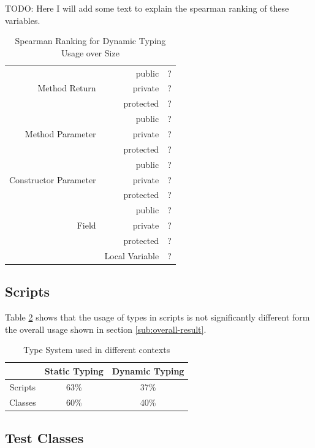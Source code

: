 \documentclass[preprint]{sigplanconf}
\begin{document}
TODO: Here I will add some text to explain the spearman ranking of these variables.

\begin{table}[ht]
\caption{Spearman Ranking for Dynamic Typing Usage over Size}


\centering{}%
\begin{tabular}{|rr|c|}
\hline 
\multirow{3}{*}{Method Return}			& public 			& ?\\
									& private 			& ?\\
									& protected		& ?\\
\hline
\multirow{3}{*}{Method Parameter}			& public 			& ?\\
									& private 			& ?\\
									& protected		& ?\\
\hline
\multirow{3}{*}{Constructor Parameter}		& public			& ?\\
									& private 			& ?\\
									& protected		& ?\\
\hline
\multirow{3}{*}{Field}					& public 			& ?\\
									& private 			& ?\\
									& protected		& ?\\
\hline
									& Local Variable	& ?\\
\hline  	
\end{tabular}
\label{tab:size_dynamic_spearman}
\end{table}



\subsection{Scripts\label{sub:scripts}}
Table \ref{tab:scritps} shows that the usage of types in scripts is not significantly different form the overall usage shown in section \ref{sub:overall-result}.

\begin{table}[ht]
\caption{Type System used in different contexts}


\centering{}%
\begin{tabular}{|c|c|c|}
\hline 
 & Static Typing & Dynamic Typing\tabularnewline
\hline 
\hline 
Scripts & 63\% & 37\%\tabularnewline
\hline 
Classes & 60\% & 40\%\tabularnewline
\hline 
\end{tabular}
\label{tab:scritps}
\end{table}


\subsection{Test Classes\label{sub:scripts}}
\end{document}
